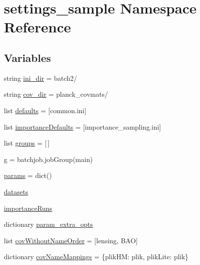 \hypertarget{namespacesettings__sample}{}\section{settings\+\_\+sample Namespace Reference}
\label{namespacesettings__sample}
\subsection*{Variables}
\begin{DoxyCompactItemize}
\item 
string \mbox{\hyperlink{namespacesettings__sample_adb7dec45357e0e55ad364e55b495ffd1}{ini\+\_\+dir}} = \textquotesingle{}batch2/\textquotesingle{}
\item 
string \mbox{\hyperlink{namespacesettings__sample_a3712096cfda3d5fea49392a25c1c2d57}{cov\+\_\+dir}} = \textquotesingle{}planck\+\_\+covmats/\textquotesingle{}
\item 
list \mbox{\hyperlink{namespacesettings__sample_aa43319d71a71391bab63b775fdd2fe22}{defaults}} = \mbox{[}\textquotesingle{}common.\+ini\textquotesingle{}\mbox{]}
\item 
list \mbox{\hyperlink{namespacesettings__sample_a7081538f8677dba238bf374372596854}{importance\+Defaults}} = \mbox{[}\textquotesingle{}importance\+\_\+sampling.\+ini\textquotesingle{}\mbox{]}
\item 
list \mbox{\hyperlink{namespacesettings__sample_a1aa216505d620201218eb3197b9d5831}{groups}} = \mbox{[}$\,$\mbox{]}
\item 
\mbox{\hyperlink{namespacesettings__sample_ae7b70a771db1aac9fa1bd75ce0e285cb}{g}} = batchjob.\+job\+Group(\textquotesingle{}main\textquotesingle{})
\item 
\mbox{\hyperlink{namespacesettings__sample_a143bcab3ee5a8abc7748522a6f416acc}{params}} = dict()
\item 
\mbox{\hyperlink{namespacesettings__sample_a3d20bbe453e963c06c5d2e08a683d744}{datasets}}
\item 
\mbox{\hyperlink{namespacesettings__sample_a9dec1bce772cf771227b345b1956000e}{importance\+Runs}}
\item 
dictionary \mbox{\hyperlink{namespacesettings__sample_a94a24cc6e85354d9fd495fdb6b108266}{param\+\_\+extra\+\_\+opts}}
\item 
list \mbox{\hyperlink{namespacesettings__sample_abd4c3de8e48070126d56d522375930f6}{cov\+Without\+Name\+Order}} = \mbox{[}\textquotesingle{}lensing\textquotesingle{}, \textquotesingle{}B\+AO\textquotesingle{}\mbox{]}
\item 
dictionary \mbox{\hyperlink{namespacesettings__sample_a01e2b1de71b0c48290eef3e08dc8fd0c}{cov\+Name\+Mappings}} = \{\textquotesingle{}plik\+HM\textquotesingle{}\+: \textquotesingle{}plik\textquotesingle{}, \textquotesingle{}plik\+Lite\textquotesingle{}\+: \textquotesingle{}plik\textquotesingle{}\}
\end{DoxyCompactItemize}



